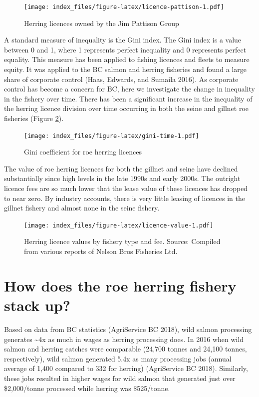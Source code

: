 \documentclass[]{article}
\theoremstyle{definition}
\theoremstyle{definition}
\theoremstyle{definition}
\theoremstyle{remark}
\begin{document}
\begin{figure}
\centering
\texttt{[image: index\_files/figure-latex/licence-pattison-1.pdf]}
\caption{\label{fig:licence-pattison}Herring licences owned by the Jim
Pattison Group}
\end{figure}

A standard measure of inequality is the Gini index. The Gini index is a
value between 0 and 1, where 1 represents perfect inequality and 0
represents perfect equality. This measure has been applied to fishing
licences and fleets to measure equity. It was applied to the BC salmon
and herring fisheries and found a large share of corporate control
(Haas, Edwards, and Sumaila 2016). As corporate control has become a
concern for BC, here we investigate the change in inequality in the
fishery over time. There has been a significant increase in the
inequality of the herring licence division over time occurring in both
the seine and gillnet roe fisheries (Figure \ref{fig:gini-time}).

\begin{figure}
\centering
\texttt{[image: index\_files/figure-latex/gini-time-1.pdf]}
\caption{\label{fig:gini-time}Gini coefficient for roe herring licences}
\end{figure}

The value of roe herring licences for both the gillnet and seine have
declined substantially since high levels in the late 1990s and early
2000s. The outright licence fees are so much lower that the lease value
of these licences has dropped to near zero. By industry accounts, there
is very little leasing of licences in the gillnet fishery and almost
none in the seine fishery.

\begin{figure}
\centering
\texttt{[image: index\_files/figure-latex/licence-value-1.pdf]}
\caption{\label{fig:licence-value}Herring licence values by fishery type and
fee. Source: Compiled from various reports of Nelson Bros Fisheries
Ltd.}
\end{figure}

\section{How does the roe herring fishery stack
up?}\label{how-does-the-roe-herring-fishery-stack-up}

Based on data from BC statistics (AgriService BC 2018), wild salmon
processing generates \textasciitilde{}4x as much in wages as herring
processing does. In 2016 when wild salmon and herring catches were
comparable (24,700 tonnes and 24,100 tonnes, respectively), wild salmon
generated 5.4x as many processing jobs (annual average of 1,400 compared
to 332 for herring) (AgriService BC 2018). Similarly, these jobs
resulted in higher wages for wild salmon that generated just over
\$2,000/tonne processed while herring was \$525/tonne.
\end{document}
